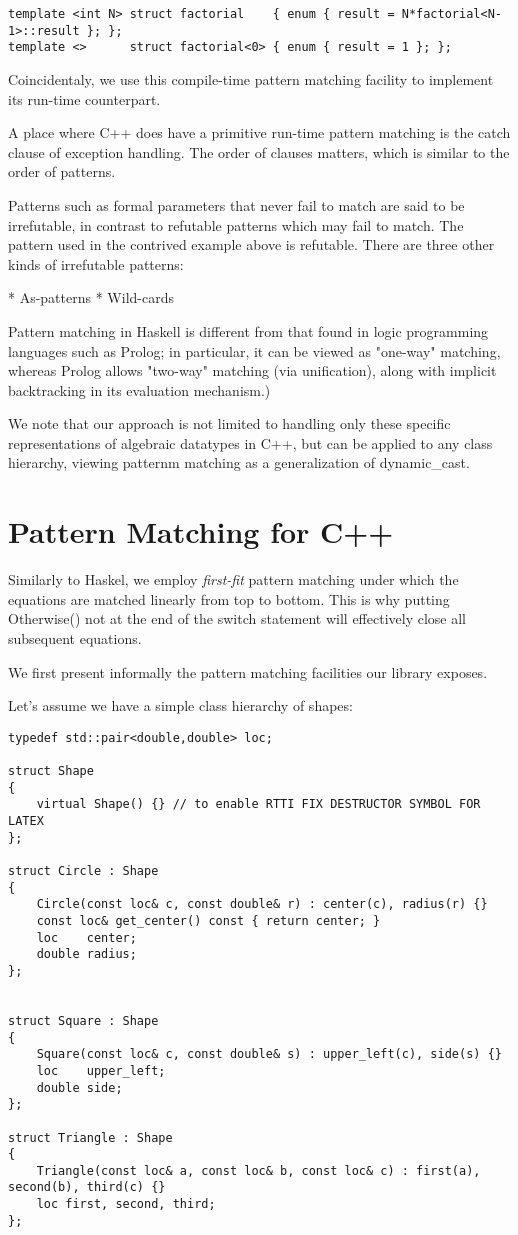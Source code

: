 \documentclass[submission,copyright]{eptcs}
\begin{document}
\begin{lstlisting}
template <int N> struct factorial    { enum { result = N*factorial<N-1>::result }; };
template <>      struct factorial<0> { enum { result = 1 }; };
\end{lstlisting}

Coincidentaly, we use this compile-time pattern matching facility to implement 
its run-time counterpart.

A place where C++ does have a primitive run-time pattern matching is the catch 
clause of exception handling. The order of clauses matters, which is similar to 
the order of patterns. 

Patterns such as formal parameters that never fail to match are said to be 
irrefutable, in contrast to refutable patterns which may fail to match. The 
pattern used in the contrived example above is refutable. There are three other 
kinds of irrefutable patterns:

* As-patterns
* Wild-cards 

Pattern matching in Haskell is different from that found in logic programming 
languages such as Prolog; in particular, it can be viewed as "one-way" matching, 
whereas Prolog allows "two-way" matching (via unification), along with implicit 
backtracking in its evaluation mechanism.) 

We note that our approach is not limited to handling only these specific 
representations of algebraic datatypes in C++, but can be applied to any class 
hierarchy, viewing patternm matching as a generalization of 
dynamic\_cast.

\section{Pattern Matching for C++} %
\label{sec:pm}

Similarly to Haskel, we employ \emph{first-fit} pattern matching under which the 
equations are matched linearly from top to bottom. This is why putting 
Otherwise() not at the end of the switch statement will effectively close all 
subsequent equations.

We first present informally the pattern matching facilities our library exposes.

Let's assume we have a simple class hierarchy of shapes:

\begin{lstlisting}
typedef std::pair<double,double> loc;

struct Shape
{
    virtual Shape() {} // to enable RTTI FIX DESTRUCTOR SYMBOL FOR LATEX
};

struct Circle : Shape
{
    Circle(const loc& c, const double& r) : center(c), radius(r) {}
    const loc& get_center() const { return center; }
    loc    center;
    double radius;
};


struct Square : Shape
{
    Square(const loc& c, const double& s) : upper_left(c), side(s) {}
    loc    upper_left;
    double side;
};

struct Triangle : Shape
{
    Triangle(const loc& a, const loc& b, const loc& c) : first(a), second(b), third(c) {}
    loc first, second, third;
};
\end{lstlisting}
\end{document}
